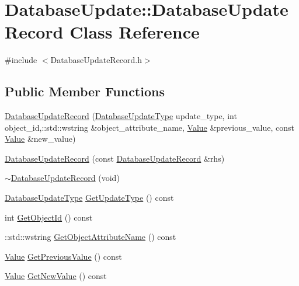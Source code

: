 \hypertarget{class_database_update_1_1_database_update_record}{}\section{Database\+Update\+:\+:Database\+Update\+Record Class Reference}
\label{class_database_update_1_1_database_update_record}


{\ttfamily \#include $<$Database\+Update\+Record.\+h$>$}

\subsection*{Public Member Functions}
\begin{DoxyCompactItemize}
\item 
\hyperlink{class_database_update_1_1_database_update_record_ad7f2d754e85f4b9f98af2e6a599d7fc0}{Database\+Update\+Record} (\hyperlink{namespace_database_update_ae6c52e997ff1fee40dea9a47376e54a1}{Database\+Update\+Type} update\+\_\+type, int object\+\_\+id,\+::std\+::wstring \&object\+\_\+attribute\+\_\+name, \hyperlink{class_value}{Value} \&previous\+\_\+value, const \hyperlink{class_value}{Value} \&new\+\_\+value)
\item 
\hyperlink{class_database_update_1_1_database_update_record_ad496db16371710ba0dbc8c59649de616}{Database\+Update\+Record} (const \hyperlink{class_database_update_1_1_database_update_record}{Database\+Update\+Record} \&rhs)
\item 
\hyperlink{class_database_update_1_1_database_update_record_a22ad652fc32bbe9a12bf3821ea63426f}{$\sim$\+Database\+Update\+Record} (void)
\item 
\hyperlink{namespace_database_update_ae6c52e997ff1fee40dea9a47376e54a1}{Database\+Update\+Type} \hyperlink{class_database_update_1_1_database_update_record_a695a9d33cccc767658b18fe5a091b614}{Get\+Update\+Type} () const 
\item 
int \hyperlink{class_database_update_1_1_database_update_record_a6e872e68a135f7f1536a8e9cb4aac961}{Get\+Object\+Id} () const 
\item 
\+::std\+::wstring \hyperlink{class_database_update_1_1_database_update_record_afce9a53f5a1b1499efb33a0f91e5aacc}{Get\+Object\+Attribute\+Name} () const 
\item 
\hyperlink{class_value}{Value} \hyperlink{class_database_update_1_1_database_update_record_ab50ca8e8f136a64d41831a333d48d9dc}{Get\+Previous\+Value} () const 
\item 
\hyperlink{class_value}{Value} \hyperlink{class_database_update_1_1_database_update_record_aac211921fa8ef56785838d8055bb37bf}{Get\+New\+Value} () const 
\end{DoxyCompactItemize}


